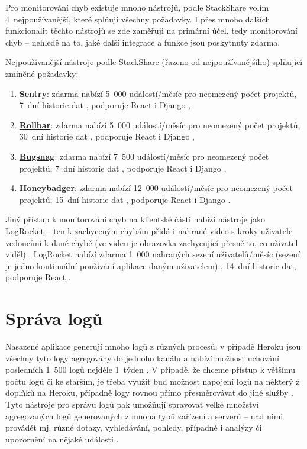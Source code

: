 Pro monitorování chyb existuje mnoho nástrojů, podle StackShare \cite{stackshare-exception} volím 4~nejpoužívanější, které splňují všechny požadavky. I přes mnoho dalších funkcionalit těchto nástrojů se zde zaměřuji na primární účel, tedy monitorování chyb -- nehledě na to, jaké další integrace a funkce jsou poskytnuty zdarma.

Nejpoužívanější nástroje podle StackShare (řazeno od nejpoužívanějšího) \cite{stackshare-exception} splňující zmíněné požadavky:
\begin{enumerate}
    \item \href{https://sentry.io/}{\textbf{Sentry}}: zdarma nabízí 5~000 událostí/měsíc pro neomezený počet projektů, 7~dní historie dat \cite{sentry-pricing}, podporuje React i Django \cite{sentry-platforms},
    \item \href{https://rollbar.com/}{\textbf{Rollbar}}: zdarma nabízí 5~000 událostí/měsíc pro neomezený počet projektů, 30~dní historie dat \cite{rollbar-pricing}, podporuje React i Django \cite{rollbar-platforms},
    \item \href{https://www.bugsnag.com/}{\textbf{Bugsnag}}: zdarma nabízí 7~500 událostí/měsíc pro neomezený počet projektů, 7~dní historie dat \cite{bugsnag-pricing}, podporuje React i Django \cite{bugsnag-platforms},
    \item \href{https://www.honeybadger.io/}{\textbf{Honeybadger}}: zdarma nabízí 12~000 událostí/měsíc pro neomezený počet projektů, 15~dní historie dat \cite{honeybadger-pricing}, podporuje React \cite{honeybadger-react} i Django \cite{honeybadger-django}.
\end{enumerate}

Jiný přístup k monitorování chyb na klientské části nabízí nástroje jako \href{https://logrocket.com/}{LogRocket} -- ten k zachyceným chybám přidá i nahrané video s kroky uživatele vedoucími k dané chybě (ve videu je obrazovka zachycující přesně to, co uživatel viděl) \cite{logrocket}. LogRocket nabízí zdarma 1~000 nahraných sezení uživatelů/měsíc (sezení je jedno kontinuální používání aplikace daným uživatelem) \cite{logrocket-pricing}, 14~dní historie dat, podporuje React \cite{logrocket-react}.

\section{Správa logů}\label{sec:spravalogu}
Nasazené aplikace generují mnoho logů z různých procesů, v případě Heroku jsou všechny tyto logy agregovány do jednoho kanálu a nabízí možnost uchování posledních 1~500 logů nejdéle 1~týden \cite{tools-logs1}. V případě, že chceme přístup k většímu počtu logů či ke starším, je třeba využít buď možnost napojení logů na některý z doplňků na Heroku, případně logy rovnou přímo přesměrovávat do jiné služby \cite{tools-logs1}. Tyto nástroje pro správu logů pak umožňují spravovat velké množství agregovaných logů generovaných z mnoha typů zařízení a serverů -- nad nimi provádět mj. různé dotazy, vyhledávání, pohledy, případně i analýzy či upozornění na nějaké události \cite{tools-logs2}.

